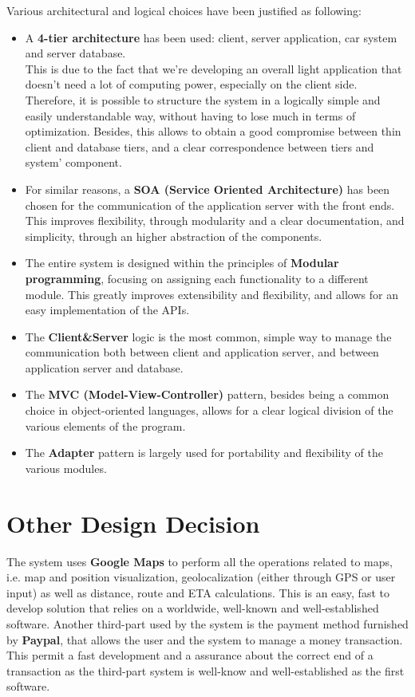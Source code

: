 Various architectural and logical choices have been justified as following:

\begin{itemize}

	\item A \textbf{4-tier architecture} has been used: client, server application, car system and server database.\\
	This is due to the fact that we're developing an overall light application that doesn't need a lot of computing power, especially on the client side. Therefore, it is possible to structure the system in a logically simple and easily understandable way, without having to lose much in terms of optimization. Besides, this allows to obtain a good compromise between thin client and database tiers, and a clear correspondence between tiers and system' component.

	\item For similar reasons, a \textbf{SOA (Service Oriented Architecture)} has been chosen for the communication of the application server with the front ends. This improves flexibility, through modularity and a clear documentation, and simplicity, through an higher abstraction of the components.

	\item The entire system is designed within the principles of \textbf{Modular programming}, focusing on assigning each functionality to a different module. This greatly improves extensibility and flexibility, and allows for an easy implementation of the APIs.

	\item The \textbf{Client\&Server} logic is the most common, simple way to manage the communication both between client and application server, and between application server and database.

	\item The \textbf{MVC (Model-View-Controller)} pattern, besides being a common choice in object-oriented languages, allows for a clear logical division of the various elements of the program.

	\item The \textbf{Adapter} pattern is largely used for portability and flexibility of the various modules.

\end{itemize}

\section{Other Design Decision}
The system uses \textbf{Google Maps} to perform all the operations related to maps, i.e. map and position visualization, geolocalization (either through GPS or user input) as well as distance, route and ETA calculations. This is an easy, fast to develop solution that relies on a worldwide, well-known and well-established software. Another third-part used by the system is the payment method furnished by \textbf{Paypal}, that allows the user and the system to manage a money transaction. This permit a fast development and a assurance about the correct end of a transaction as the third-part system is well-know and well-established as the first software.
